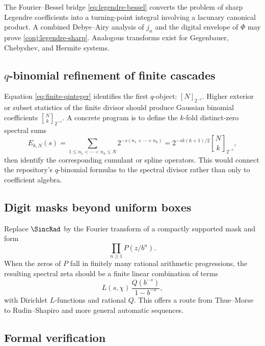 \documentclass[11pt,oneside]{article}
\theoremstyle{definition}
\theoremstyle{remark}
\begin{document}
The Fourier--Bessel bridge \eqref{eq:legendre-bessel} converts the problem of
sharp Legendre coefficients into a turning-point integral involving a
lacunary canonical product.  A combined Debye--Airy analysis of \(j_n\) and
the digital envelope of \(\Phi\) may prove \cref{conj:legendre-sharp}.
Analogous transforms exist for Gegenbauer, Chebyshev, and Hermite systems.

\subsection{\(q\)-binomial refinement of finite cascades}

Equation \eqref{eq:finite-qinteger} identifies the first \(q\)-object:
\([N]_{2^{-s}}\).  Higher exterior or subset statistics of the finite divisor
should produce Gaussian binomial coefficients
\(\genfrac{[}{]}{0pt}{}{N}{k}_{2^{-s}}\).  A concrete program is to define
the \(k\)-fold distinct-zero spectral sums
\[
 E_{k,N}(s)
 =\sum_{1\leq n_1<\cdots<n_k\leq N}
 2^{-s(n_1+\cdots+n_k)}
 =2^{-sk(k+1)/2}
  \genfrac{[}{]}{0pt}{}{N}{k}_{2^{-s}},
\]
then identify the corresponding cumulant or spline operators.  This would
connect the repository's \(q\)-binomial formulas to the spectral divisor
rather than only to coefficient algebra.

\subsection{Digit masks beyond uniform boxes}

Replace \(\SincRad\) by the Fourier transform of a compactly supported mask and
form
\[
 \prod_{n\geq1}P(z/b^n).
\]
When the zeros of \(P\) fall in finitely many rational arithmetic
progressions, the resulting spectral zeta should be a finite linear
combination of terms
\[
 L(s,\chi)\,\frac{Q(b^{-s})}{1-b^{-s}},
\]
with Dirichlet \(L\)-functions and rational \(Q\).  This offers a route from
Thue--Morse to Rudin--Shapiro and more general automatic sequences.

\subsection{Formal verification}
\end{document}
